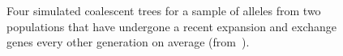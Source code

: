 \documentclass[12pt]{article}
\begin{document}
\begin{figure}
\begin{center}
\end{center}
\caption{Four simulated coalescent trees for a sample of alleles from
  two populations that have undergone a recent expansion and exchange
  genes every other generation on average
  (from~\cite{Harpending-etal-1998}).}\label{fig:coalescent-expansion} 
\end{figure}
\end{document}
